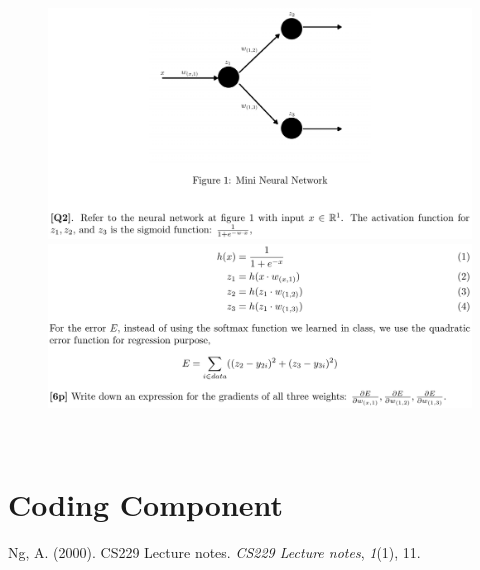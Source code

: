 \documentclass[12pt]{article}
\newenvironment{solution}[2][Solution]{\begin{trivlist}
\item[\hskip \labelsep {\bfseries #1}]}{\end{trivlist}}
\begin{document}
\begin{figure}[h!]
\includegraphics[width=\linewidth]{./assets/201806022242.png}
\includegraphics[width=\linewidth]{./assets/201806022243.png}
\end{figure}

\begin{solution}{}~

\end{solution}

\section{Coding Component}


\begin{thebibliography}{9}
 Ng, A. (2000). CS229 Lecture notes. \emph{CS229 Lecture notes}, \emph{1}(1), 11.
\end{thebibliography}
\end{document}
